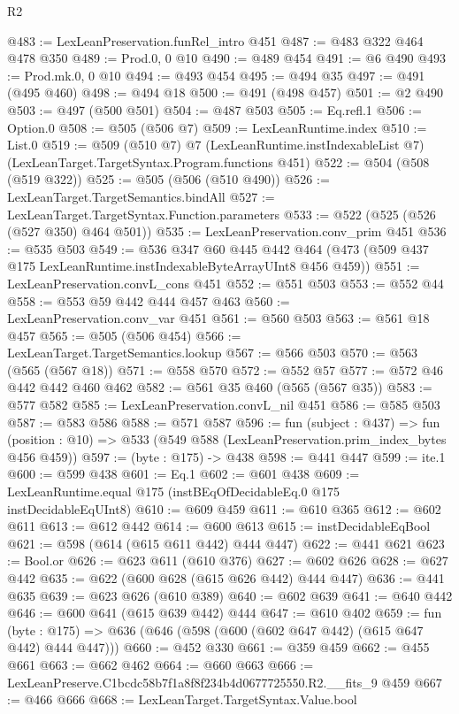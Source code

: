 \begin{lexlean}{R2}
\begin{coremodule}
@483 := LexLeanPreservation.funRel_intro @451
@487 := @483 @322 @464 @478 @350
@489 := Prod.{0, 0} @10
@490 := @489 @454
@491 := @6 @490
@493 := Prod.mk.{0, 0} @10
@494 := @493 @454
@495 := @494 @35
@497 := @491 (@495 @460)
@498 := @494 @18
@500 := @491 (@498 @457)
@501 := @2 @490
@503 := @497 (@500 @501)
@504 := @487 @503
@505 := Eq.refl.{1}
@506 := Option.{0}
@508 := @505 (@506 @7)
@509 := LexLeanRuntime.index
@510 := List.{0}
@519 := @509
    (@510 @7)
    @7
    (LexLeanRuntime.instIndexableList @7)
    (LexLeanTarget.TargetSyntax.Program.functions @451)
@522 := @504 (@508 (@519 @322))
@525 := @505 (@506 (@510 @490))
@526 := LexLeanTarget.TargetSemantics.bindAll
@527 := LexLeanTarget.TargetSyntax.Function.parameters
@533 := @522 (@525 (@526 (@527 @350) @464 @501))
@535 := LexLeanPreservation.conv_prim @451
@536 := @535 @503
@549 := @536
    @347
    @60
    @445
    @442
    @464
    (@473 (@509 @437 @175 LexLeanRuntime.instIndexableByteArrayUInt8 @456 @459))
@551 := LexLeanPreservation.convL_cons @451
@552 := @551 @503
@553 := @552 @44
@558 := @553 @59 @442 @444 @457 @463
@560 := LexLeanPreservation.conv_var @451
@561 := @560 @503
@563 := @561 @18 @457
@565 := @505 (@506 @454)
@566 := LexLeanTarget.TargetSemantics.lookup
@567 := @566 @503
@570 := @563 (@565 (@567 @18))
@571 := @558 @570
@572 := @552 @57
@577 := @572 @46 @442 @442 @460 @462
@582 := @561 @35 @460 (@565 (@567 @35))
@583 := @577 @582
@585 := LexLeanPreservation.convL_nil @451
@586 := @585 @503
@587 := @583 @586
@588 := @571 @587
@596 := fun (subject : @437) =>
  fun (position : @10) => @533 (@549 @588 (LexLeanPreservation.prim_index_bytes @456 @459))
@597 := (byte : @175) -> @438
@598 := @441 @447
@599 := ite.{1}
@600 := @599 @438
@601 := Eq.{1}
@602 := @601 @438
@609 := LexLeanRuntime.equal @175 (instBEqOfDecidableEq.{0} @175 instDecidableEqUInt8)
@610 := @609 @459
@611 := @610 @365
@612 := @602 @611
@613 := @612 @442
@614 := @600 @613
@615 := instDecidableEqBool
@621 := @598 (@614 (@615 @611 @442) @444 @447)
@622 := @441 @621
@623 := Bool.or
@626 := @623 @611 (@610 @376)
@627 := @602 @626
@628 := @627 @442
@635 := @622 (@600 @628 (@615 @626 @442) @444 @447)
@636 := @441 @635
@639 := @623 @626 (@610 @389)
@640 := @602 @639
@641 := @640 @442
@646 := @600 @641 (@615 @639 @442) @444
@647 := @610 @402
@659 := fun (byte : @175) => @636 (@646 (@598 (@600 (@602 @647 @442) (@615 @647 @442) @444 @447)))
@660 := @452 @330
@661 := @359 @459
@662 := @455 @661
@663 := @662 @462
@664 := @660 @663
@666 := LexLeanPreserve.C1bcdc58b7f1a8f8f234b4d0677725550.R2.__fits_9 @459
@667 := @466 @666
@668 := LexLeanTarget.TargetSyntax.Value.bool

\end{coremodule}
\end{lexlean}
